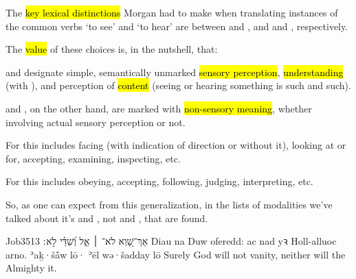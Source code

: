 \begin{paper}
	{\click} The \hl{key lexical distinctions} Morgan had to make when translating instances of the common verbs  ‘to see’ and  ‘to hear’ are between  and , and  and , respectively.

	{\click} The \hl{value} of these choices is, in the nutshell, that:
	\begin{compactitem}
		\item {} and  designate simple, semantically unmarked \hl{sensory perception}, \hl{understanding} (with ), and perception of \hl{content} (seeing or hearing something is such and such).
		\item {} and , on the other hand, are marked with \hl{non-sensory meaning}, whether involving actual sensory perception or not.
			\begin{compactitem}
				\item For  this includes facing (with indication of direction or without it), looking at or for, accepting, examining, inspecting, etc.
				\item For  this includes obeying, accepting, following, judging, interpreting, etc.
			\end{compactitem}
	\end{compactitem}

	So, as one can expect from this generalization, in the lists of modalities we’ve talked about it’s  and , not  and , that are found.
\end{paper}



\begin{example}{Job}{35}{13}{}{}
	\quoling
	{אַךְ־שָׁ֭וְא לֹא־ ׀ אֵ֑ל וְ֝שַׁדַּ֗י לֹ֣א ׃}
	{Diau na  Duw oferedd: ac nad  yꝛ Holl-alluoc arno.}
	{ʾaḵ·šå̄w lō· ʾēl wə·šadday lō }
	{Surely God will not  vanity, neither will the Almighty  it.}
\end{example}

